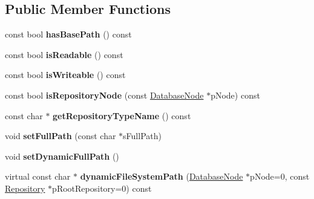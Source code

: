 \subsection*{\-Public \-Member \-Functions}
\begin{DoxyCompactItemize}
\item 
\hypertarget{classgeneral__server_1_1Repository_abf0074119eca14a80cb126b576f71ede}{const bool {\bfseries has\-Base\-Path} () const }\label{classgeneral__server_1_1Repository_abf0074119eca14a80cb126b576f71ede}

\item 
\hypertarget{classgeneral__server_1_1Repository_a81dbb56752aa31ef47fff54a4d75be63}{const bool {\bfseries is\-Readable} () const }\label{classgeneral__server_1_1Repository_a81dbb56752aa31ef47fff54a4d75be63}

\item 
\hypertarget{classgeneral__server_1_1Repository_a5be102bb424ee2c68bab257451acdb34}{const bool {\bfseries is\-Writeable} () const }\label{classgeneral__server_1_1Repository_a5be102bb424ee2c68bab257451acdb34}

\item 
\hypertarget{classgeneral__server_1_1Repository_a983cf25cead5cc56a47fd6ab55a54aa0}{const bool {\bfseries is\-Repository\-Node} (const \hyperlink{classgeneral__server_1_1DatabaseNode}{\-Database\-Node} $\ast$p\-Node) const }\label{classgeneral__server_1_1Repository_a983cf25cead5cc56a47fd6ab55a54aa0}

\item 
\hypertarget{classgeneral__server_1_1Repository_abef4467b5bfcf6656ffc5141bf192838}{const char $\ast$ {\bfseries get\-Repository\-Type\-Name} () const }\label{classgeneral__server_1_1Repository_abef4467b5bfcf6656ffc5141bf192838}

\item 
\hypertarget{classgeneral__server_1_1Repository_a1095a307a4a7513bf85a7664dddce37d}{void {\bfseries set\-Full\-Path} (const char $\ast$s\-Full\-Path)}\label{classgeneral__server_1_1Repository_a1095a307a4a7513bf85a7664dddce37d}

\item 
\hypertarget{classgeneral__server_1_1Repository_a203a6e83d145a3b0a79b7895ccefcb5c}{void {\bfseries set\-Dynamic\-Full\-Path} ()}\label{classgeneral__server_1_1Repository_a203a6e83d145a3b0a79b7895ccefcb5c}

\item 
\hypertarget{classgeneral__server_1_1Repository_a3527b33ac0ddd246fbf48caa081cb7c1}{virtual const char $\ast$ {\bfseries dynamic\-File\-System\-Path} (\hyperlink{classgeneral__server_1_1DatabaseNode}{\-Database\-Node} $\ast$p\-Node=0, const \hyperlink{classgeneral__server_1_1Repository}{\-Repository} $\ast$p\-Root\-Repository=0) const }\label{classgeneral__server_1_1Repository_a3527b33ac0ddd246fbf48caa081cb7c1}


\end{DoxyCompactItemize}
